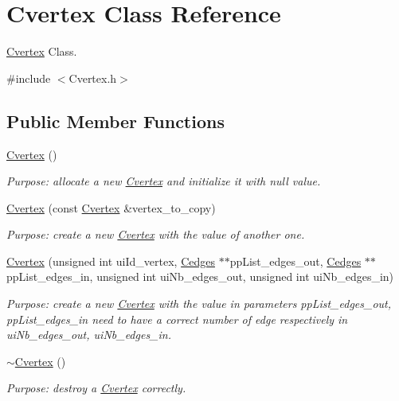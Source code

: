 \hypertarget{class_cvertex}{}\section{Cvertex Class Reference}
\label{class_cvertex}


\hyperlink{class_cvertex}{Cvertex} Class.  




{\ttfamily \#include $<$Cvertex.\+h$>$}

\subsection*{Public Member Functions}
\begin{DoxyCompactItemize}
\item 
\hyperlink{class_cvertex_a4256affe77ee305afaf51aa9fcbd1cf0}{Cvertex} ()
\begin{DoxyCompactList}\small\item\em Purpose\+: allocate a new \hyperlink{class_cvertex}{Cvertex} and initialize it with null value. \end{DoxyCompactList}\item 
\hyperlink{class_cvertex_a3c091dc9431a4144f9d97767dd996186}{Cvertex} (const \hyperlink{class_cvertex}{Cvertex} \&vertex\+\_\+to\+\_\+copy)
\begin{DoxyCompactList}\small\item\em Purpose\+: create a new \hyperlink{class_cvertex}{Cvertex} with the value of another one. \end{DoxyCompactList}\item 
\hyperlink{class_cvertex_a9a4fa4f830633c4adabd066c75ca148d}{Cvertex} (unsigned int ui\+Id\+\_\+vertex, \hyperlink{class_cedges}{Cedges} $\ast$$\ast$pp\+List\+\_\+edges\+\_\+out, \hyperlink{class_cedges}{Cedges} $\ast$$\ast$pp\+List\+\_\+edges\+\_\+in, unsigned int ui\+Nb\+\_\+edges\+\_\+out, unsigned int ui\+Nb\+\_\+edges\+\_\+in)
\begin{DoxyCompactList}\small\item\em Purpose\+: create a new \hyperlink{class_cvertex}{Cvertex} with the value in parameters pp\+List\+\_\+edges\+\_\+out, pp\+List\+\_\+edges\+\_\+in need to have a correct number of edge respectively in ui\+Nb\+\_\+edges\+\_\+out, ui\+Nb\+\_\+edges\+\_\+in. \end{DoxyCompactList}\item 
\hyperlink{class_cvertex_a91b564020e4c5b73f971f8d4e35dd952}{$\sim$\+Cvertex} ()
\begin{DoxyCompactList}\small\item\em Purpose\+: destroy a \hyperlink{class_cvertex}{Cvertex} correctly. \end{DoxyCompactList}\item 

\end{DoxyCompactItemize}
